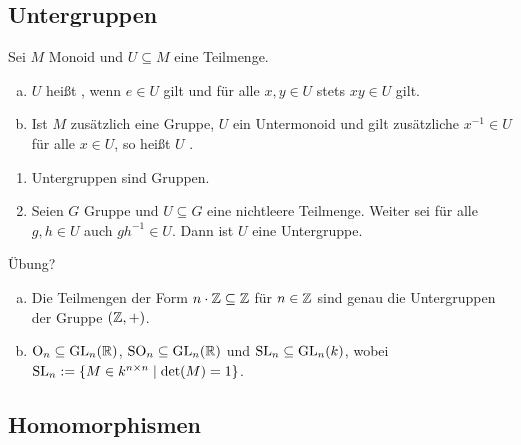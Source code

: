\subsection{Untergruppen}

\begin{definition}
  Sei \(M\) Monoid und \(U\subseteq M\) eine Teilmenge.
  \begin{enumerate}[(a)]
  \item \(U\) heißt , wenn \(e\in U\) gilt und für alle \(x,y\in U\) stets \(xy\in U\) gilt.
  \item Ist \(M\) zusätzlich eine Gruppe, \(U\) ein Untermonoid und gilt zusätzliche \(x^{-1}\in U\) für alle \(x\in U\), so heißt \(U\) .
  \end{enumerate}
\end{definition}

\begin{lemma}
  \begin{enumerate}
  \item Untergruppen sind Gruppen.
  \item Seien \(G\) Gruppe und \(U\subseteq G\) eine nichtleere Teilmenge.
  Weiter sei für alle \(g,h\in U\) auch \(gh^{-1}\in U\).
  Dann ist \(U\) eine Untergruppe.
  \end{enumerate}
\end{lemma}

\begin{beweis}
  Übung?
\end{beweis}

\begin{beispiel}
  \label{untergruppen-von-ZZ-und matrizengruppen}
  \begin{enumerate}[(a)]
  \item Die Teilmengen der Form \(n\cdot \mathbb{Z}\subseteq \mathbb{Z}\) für \(n\in\mathbb{Z}\) sind genau die Untergruppen der Gruppe \((\mathbb{Z},+)\).
  \item \(\mathrm{O}_n\subseteq \mathrm{GL}_n(\mathbb{R})\), \(\mathrm{SO}_n\subseteq \mathrm{GL}_n(\mathbb{R})\) und \(\mathrm{SL}_n\subseteq \mathrm{GL}_n(k)\), wobei \(\mathrm{SL}_n:=\{M\in k^{n\times n}\mid \det(M)=1\}\).
  \end{enumerate}
\end{beispiel}

\subsection{Homomorphismen}

